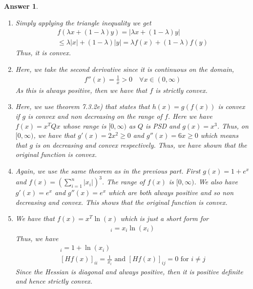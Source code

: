 \documentclass[12pt]{article}
\theoremstyle{colon}
\newtheorem*{answer}{Answer}
\begin{document}
\begin{answer}
  \

  \begin{enumerate}[label=\alph*)]
    \item Simply applying the triangle inequality we get
      \begin{gather*}
        f(\lambda x + (1-\lambda)y) = \lvert \lambda x + (1-\lambda) y \rvert \\
        \leq \lambda \lvert x \rvert + (1-\lambda) \lvert y \rvert = \lambda f(x) + (1-\lambda) f(y)
      \end{gather*}
      Thus, it is convex.

    \item Here, we take the second derivative since it is continuous on the domain,
      \begin{gather*}
        f''(x) = \frac{1}{x} > 0 \quad \forall x \in (0,\infty)
      \end{gather*}
      As this is always positive, then we have that $f$ is strictly convex.

    \item Here, we use theorem 7.3.2e) that states that $h(x) = g(f(x))$ is convex if $g$ is convex and non decreasing on the range of $f$. Here we have $f(x) = x^T Q x$ whose range is $[0, \infty)$ as $Q$ is PSD and $g(x) = x^3$. Thus, on $[0, \infty)$, we have that $g'(x) = 2 x^2 \geq 0$ and $g''(x) = 6 x \geq 0$ which means that $g$ is on decreasing and convex respectively. Thus, we have shown that the original function is convex.

    \item Again, we use the same theorem as in the previous part. First $g(x) = 1 + e^x$ and $f(x) = (\sum_{i=1}^n \lvert x_i \rvert )^3$. The range of $f(x)$ is $[0, \infty)$. We also have $g'(x) = e^x$ and $g''(x) = e^x$ which are both always positive and so non decreasing and convex. This shows that the original function is convex.

    \item We have that $f(x) = x^T \ln(x)$ which is just a short form for
      \begin{gather*}
        [f(x)]_i = x_i \ln(x_i)
      \end{gather*}
      Thus, we have
      \begin{gather*}
        [\nabla f(x)]_i = 1 + \ln(x_i) \\
        [Hf(x)]_{ii} = \frac{1}{x_i} \text{ and } [Hf(x)]_{ij} = 0 \text{ for } i \neq j
      \end{gather*}
      Since the Hessian is diagonal and always positive, then it is positive definite and hence strictly convex.
  \end{enumerate}
\end{answer}
\end{document}
